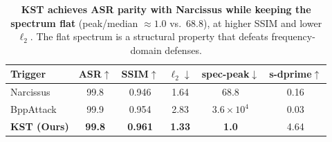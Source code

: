 \begin{table}[t]
\centering
\small
\begin{tabular}{l c c c c c}
\toprule
Trigger & ASR$\uparrow$ & SSIM$\uparrow$ & $\ell_2$$\downarrow$ & spec-peak$\downarrow$ & s-dprime$\uparrow$ \\
\midrule
Narcissus & 99.8 & 0.946 & 1.64 & 68.8 & 0.16 \\
BppAttack & 99.9 & 0.954 & 2.83 & $3.6{\times}10^4$ & 0.03 \\
\textbf{KST (Ours)} & \textbf{99.8} & \textbf{0.961} & \textbf{1.33} & \textbf{1.0} & 4.64 \\
\bottomrule
\end{tabular}
\caption{\textbf{KST achieves ASR parity with Narcissus while keeping the
spectrum flat} (peak/median $\approx\!1.0$ vs.\ $68.8$), at higher SSIM and lower
$\ell_2$. The flat spectrum is a structural property that defeats
frequency-domain defenses.}
\label{tab:kst}
\end{table}
